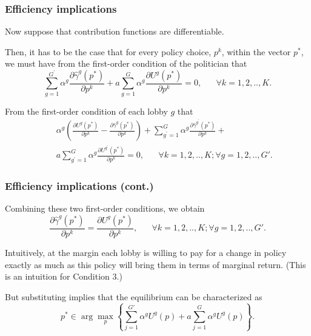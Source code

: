 \documentclass[11pt,aspectratio=169]{beamer}
\begin{document}
\begin{frame}
\frametitle{Efficiency implications}

Now suppose that contribution functions are differentiable.

Then, it has to be the case that for every policy choice, $p^{k}$, within the vector $p^*$, we must have from the first-order condition of the politician that 
\begin{equation*}
\sum_{g=1}^{G^{\prime }}\alpha ^{g}\frac{\partial \hat{\gamma}^{g}\left(p^{\ast }\right) }{\partial p^{k}}+a\sum_{g=1}^{G}\alpha ^{g}\frac{\partial U^{g}\left( p^{\ast }\right) }{\partial p^{k}}=0, \hspace{20pt} \forall k=1,2,..,K. 
\end{equation*}

From the first-order condition of each lobby $g$ that
\begin{eqnarray*}
&&\alpha ^{g}\left( \frac{\partial U^{g}\left( p^{\ast }\right) }{\partial p^{k}} - \frac{\partial \hat{\gamma}^{g}\left( p^{\ast }\right) }{\partial p^{k}} \right) +\sum_{g^{\prime }=1}^{G}\alpha ^{g}\frac{\partial \hat{\gamma}^{g^{\prime }}\left( p^{\ast }\right) }{\partial p^{k}}+ \\
&&a\sum_{g^{\prime }=1}^{G}\alpha ^{g}\frac{\partial U^{g^{\prime }}\left(p^{\ast }\right) }{\partial p^{k}}=0, \hspace{20pt} \forall k=1,2,..,K ; \forall g=1,2,..,G'.
\end{eqnarray*}

\end{frame}

\begin{frame}
\frametitle{Efficiency implications (cont.)}

Combining these two first-order conditions, we obtain \begin{equation}
\frac{\partial \hat{\gamma}^{g}\left( p^{\ast }\right) }{\partial p^{k}}=\frac{\partial U^{g}\left( p^{\ast }\right) }{\partial p^{k}}, \hspace{20pt} \forall k=1,2,..,K ; \forall g=1,2,..,G'. \label{lobbying equilibrium}
\end{equation}

Intuitively, at the margin each lobby is willing to pay for a change in policy exactly as much as this policy will bring them in terms of marginal return. (This is an intuition for Condition 3.)

But substituting implies that the equilibrium can be characterized as \begin{equation*}
p^*\in \arg \max_{p} \left\lbrace \sum_{j=1}^{G'}\alpha^gU^g(p) + a\sum_{j=1}^G\alpha^gU^g(p) \right\rbrace.
\end{equation*}

\end{frame}
\end{document}
